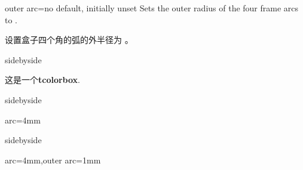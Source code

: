 \begin{docTcbKey}{outer arc}{=}{no default, initially unset}
Sets the outer radius of the four frame arcs to .

设置盒子四个角的弧的外半径为 。

\begin{dispExample*}{sidebyside}
\begin{tcolorbox}[]
这是一个\textbf{tcolorbox}.
\end{tcolorbox}
\end{dispExample*}

\begin{dispExample*}{sidebyside}
\begin{tcolorbox}[arc=4mm]
arc=4mm
\end{tcolorbox}
\end{dispExample*}

\begin{dispExample*}{sidebyside}
\begin{tcolorbox}[arc=4mm,%
outer arc=1mm]
arc=4mm,outer arc=1mm
\end{tcolorbox}
\end{dispExample*}
\end{docTcbKey}

